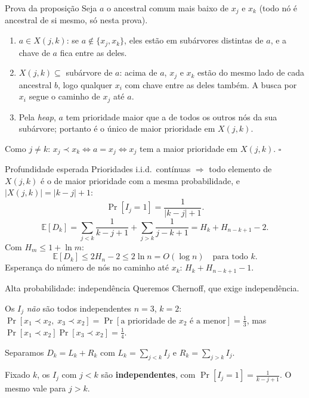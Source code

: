 \documentclass[aspectratio=169,11pt]{beamer}
\newcommand{\E}[1]{\mathbb{E}\!\left[#1\right]}
\newcommand{\ProbE}[1]{\Pr\!\left[#1\right]}
\theoremstyle{definition}
\begin{document}
\begin{frame}{Prova da proposição}
  Seja $a$ o ancestral comum mais baixo de $x_j$ e $x_k$ (todo nó é
  ancestral de si mesmo, só nesta prova).
  \begin{enumerate}
  \item[(i)] $a\in X(j,k)$: se $a\notin\{x_j,x_k\}$, eles estão em
    subárvores distintas de $a$, e a chave de $a$ fica entre as deles.
    \pause
  \item[(ii)] $X(j,k)\subseteq$ subárvore de $a$: acima de $a$, $x_j$
    e $x_k$ estão do mesmo lado de cada ancestral $b$, logo qualquer
    $x_i$ com chave entre as deles também. A busca por $x_i$ segue o
    caminho de $x_j$ até $a$.
    \pause
  \item[(iii)] Pela \emph{heap}, $a$ tem prioridade maior que a de
    todos os outros nós da sua subárvore; portanto é o único de maior
    prioridade em $X(j,k)$.
  \end{enumerate}
  \pause
  Como $j\neq k$: $x_j\prec x_k\iff a=x_j\iff x_j$ tem a maior
  prioridade em $X(j,k)$. \hfill $\square$
\end{frame}

\begin{frame}{Profundidade esperada}
  Prioridades i.i.d.\ contínuas $\Rightarrow$ todo elemento de $X(j,k)$
  é o de maior prioridade com a mesma probabilidade, e
  $|X(j,k)|=|k-j|+1$:
  \[
    \ProbE{I_j=1}=\frac{1}{|k-j|+1}.
  \]
  \pause
  \[
    \E{D_k}
    =\sum_{j<k}\frac1{k-j+1}+\sum_{j>k}\frac1{j-k+1}
    =H_k+H_{n-k+1}-2 .
  \]
  \pause
  Com $H_m\le1+\ln m$:
  \[
    \E{D_k}\le2H_n-2\le2\ln n=O(\log n)\quad\text{para todo }k.
  \]
  \medskip
  Esperança do número de nós no caminho até $x_k$:
  $H_k+H_{n-k+1}-1$.
\end{frame}

\begin{frame}{Alta probabilidade: independência}
  Queremos Chernoff, que exige independência.

  \begin{alertblock}{Os $I_j$ \emph{não} são todos independentes}
    $n=3$, $k=2$:
    $\ProbE{x_1\prec x_2,\;x_3\prec x_2}
    =\ProbE{\text{a prioridade de }x_2\text{ é a menor}}=\tfrac13$,
    mas $\ProbE{x_1\prec x_2}\ProbE{x_3\prec x_2}=\tfrac14$.
  \end{alertblock}
  \pause
  \vspace{1ex}
  Separamos $D_k=L_k+R_k$ com
  $L_k=\sum_{j<k}I_j$ e $R_k=\sum_{j>k}I_j$.

  \begin{lemma}
    Fixado $k$, os $I_j$ com $j<k$ são \textbf{independentes}, com
    $\ProbE{I_j=1}=\frac1{k-j+1}$. O mesmo vale para $j>k$.
  \end{lemma}
\end{frame}
\end{document}
